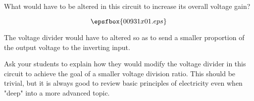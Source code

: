 

What would have to be altered in this circuit to increase its overall voltage gain?

$$\epsfbox{00931x01.eps}$$







The voltage divider would have to altered so as to send a smaller proportion of the output voltage to the inverting input.







Ask your students to explain how they would modify the voltage divider in this circuit to achieve the goal of a smaller voltage division ratio.  This should be trivial, but it is always good to review basic principles of electricity even when "deep" into a more advanced topic.





